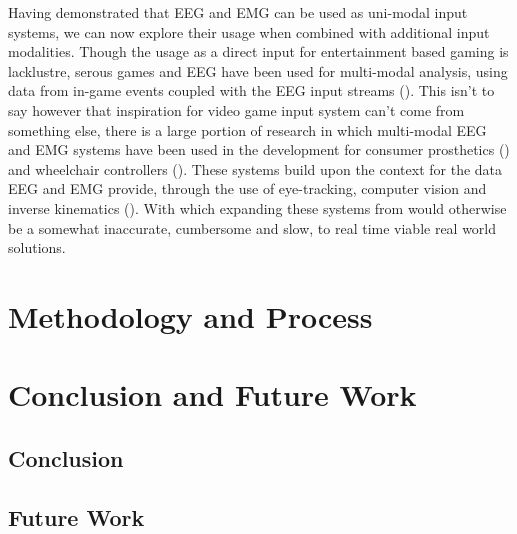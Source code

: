\documentclass[11pt, a4paper]{article}
\newcommand{\citethis}[1]{(\cite{#1})}
\begin{document}
\hfill

Having demonstrated that EEG and EMG can be used as uni-modal input systems, we can now explore their usage when combined with additional input modalities. Though the usage as a direct input for entertainment based gaming is lacklustre, serous games and EEG have been used for multi-modal analysis, using data from in-game events coupled with the EEG input streams \citethis{sivanathan2014temporal}. This isn't to say however that inspiration for video game input system can't come from something else, there is a large portion of research in which multi-modal EEG and EMG systems have been used in the development for consumer prosthetics \citethis{shi2019novel} and wheelchair controllers \citethis{carlson2013brain}. These systems build upon the context for the data EEG and EMG provide, through the use of eye-tracking, computer vision and inverse kinematics \citethis{mcmullen2013demonstration}. With which expanding these systems from would otherwise be a somewhat inaccurate, cumbersome and slow, to real time viable real world solutions. 



\pagebreak
\section{Methodology and Process}			%





\pagebreak
\section{Conclusion and Future Work}

\subsection{Conclusion}

\subsection{Future Work}			%




\pagebreak
\printbibliography
\printbibliography[keyword = software, title = {Software}]
\end{document}

